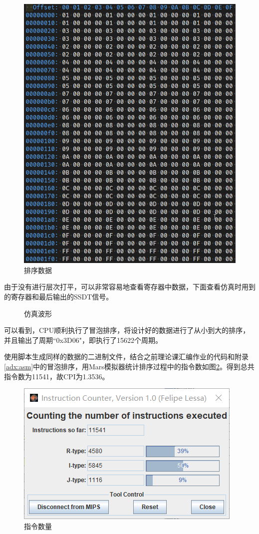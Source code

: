 \documentclass[a4paper]{article}
\begin{document}
\begin{figure}[H]
    \centering
    \includegraphics[width=.5\textwidth]{../assets/检验数据.png}
    \caption{排序数据}
    \label{fig:排序数据}
\end{figure}

由于没有进行层次打平，可以非常容易地查看寄存器中数据，下面查看仿真时用到的寄存器和最后输出的SSDT信号。

\begin{figure}[H]
    \centering
    \caption{仿真波形}
\end{figure}

可以看到，CPU顺利执行了冒泡排序，将设计好的数据进行了从小到大的排序，并且输出了周期“0x3D06"，即执行了15622个周期。

使用脚本生成同样的数据的二进制文件，结合之前理论课汇编作业的代码和附录\ref{adx:asm}中的冒泡排序，用Mars模拟器统计排序过程中的指令数如图\ref{fig:指令数量}。得到总共指令数为11541，故CPI为1.3536。

\begin{figure}[H]
    \centering
    \includegraphics[width=.6\textwidth]{../assets/ins.png}
    \caption{指令数量}
    \label{fig:指令数量}
\end{figure}
\end{document}
